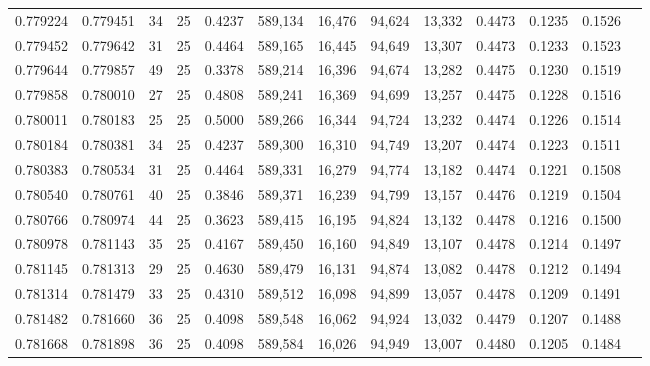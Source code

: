 \begin{tabular}{rrrrrrrrrrrrr}
0.779224 & 0.779451 &    34 &  25 &                                     0.4237 & 589,134 &  16,476 &  94,624 &  13,332 & 0.4473 & 0.1235 & 0.1526 \\
0.779452 & 0.779642 &    31 &  25 &                                     0.4464 & 589,165 &  16,445 &  94,649 &  13,307 & 0.4473 & 0.1233 & 0.1523 \\
0.779644 & 0.779857 &    49 &  25 &                                     0.3378 & 589,214 &  16,396 &  94,674 &  13,282 & 0.4475 & 0.1230 & 0.1519 \\
0.779858 & 0.780010 &    27 &  25 &                                     0.4808 & 589,241 &  16,369 &  94,699 &  13,257 & 0.4475 & 0.1228 & 0.1516 \\
0.780011 & 0.780183 &    25 &  25 &                                     0.5000 & 589,266 &  16,344 &  94,724 &  13,232 & 0.4474 & 0.1226 & 0.1514 \\
0.780184 & 0.780381 &    34 &  25 &                                     0.4237 & 589,300 &  16,310 &  94,749 &  13,207 & 0.4474 & 0.1223 & 0.1511 \\
0.780383 & 0.780534 &    31 &  25 &                                     0.4464 & 589,331 &  16,279 &  94,774 &  13,182 & 0.4474 & 0.1221 & 0.1508 \\
0.780540 & 0.780761 &    40 &  25 &                                     0.3846 & 589,371 &  16,239 &  94,799 &  13,157 & 0.4476 & 0.1219 & 0.1504 \\
0.780766 & 0.780974 &    44 &  25 &                                     0.3623 & 589,415 &  16,195 &  94,824 &  13,132 & 0.4478 & 0.1216 & 0.1500 \\
0.780978 & 0.781143 &    35 &  25 &                                     0.4167 & 589,450 &  16,160 &  94,849 &  13,107 & 0.4478 & 0.1214 & 0.1497 \\
0.781145 & 0.781313 &    29 &  25 &                                     0.4630 & 589,479 &  16,131 &  94,874 &  13,082 & 0.4478 & 0.1212 & 0.1494 \\
0.781314 & 0.781479 &    33 &  25 &                                     0.4310 & 589,512 &  16,098 &  94,899 &  13,057 & 0.4478 & 0.1209 & 0.1491 \\
0.781482 & 0.781660 &    36 &  25 &                                     0.4098 & 589,548 &  16,062 &  94,924 &  13,032 & 0.4479 & 0.1207 & 0.1488 \\
0.781668 & 0.781898 &    36 &  25 &                                     0.4098 & 589,584 &  16,026 &  94,949 &  13,007 & 0.4480 & 0.1205 & 0.1484 \\

\end{tabular}
